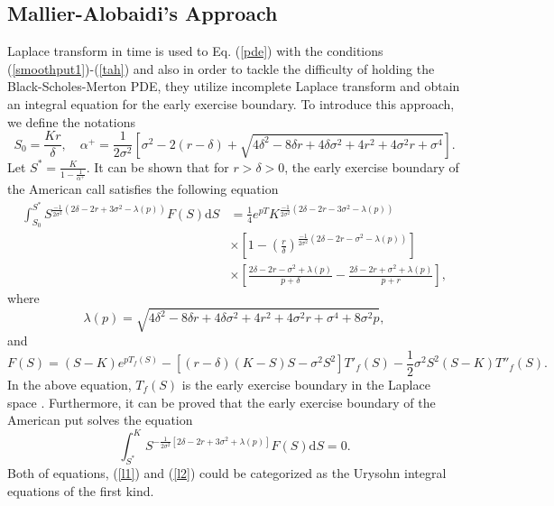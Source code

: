 \documentclass[fleqn,final,3p,11pt]{elsarticle}
\theoremstyle{definition}
\theoremstyle{remark}
\numberwithin{equation}{section}
\begin{document}
\begin{appendices}
\subsection{Mallier-Alobaidi's Approach}
Laplace transform in time is used to Eq. (\ref{pde}) with the conditions (\ref{smoothput1})-(\ref{tah}) and also in order to tackle the difficulty of holding the Black-Scholes-Merton PDE, they utilize incomplete Laplace transform and obtain an integral equation for the early exercise boundary.
To introduce this approach, we define the notations
\[
S_{0} = \frac{Kr}{\delta}, \quad \alpha^{+}= \frac{1}{2\sigma^{2}}\left[  \sigma^{2} -2(r-\delta) + \sqrt{4 \delta^{2} - 8 \delta r + 4 \delta \sigma^{2} + 4 r^{2} + 4\sigma^{2}r + \sigma^{4} } \right].
 \]
Let $S^{*} =  \frac{K}{1-\frac{1}{\alpha^{+}}}$. It can be shown that for $r>\delta>0$, the early exercise boundary of the American call satisfies  the following equation
 \begin{equation}\label{l1}
  \begin{split}
 \int_{S_{0}}^{S^{*}} S^{\frac{-1}{2 \sigma^{2}}\left( 2 \delta -2r + 3\sigma^{2}-\lambda(p)\right) } F(S)\mathrm{d}S&  = \frac{1}{4}e^{pT}K^{\frac{-1}{2\sigma^{2}}\left( 2 \delta -2r -3 \sigma^{2}-\lambda(p) \right) }\\
 & \times \left[ 1 - (\frac{r}{\delta})^{\frac{-1}{2\sigma^{2}}\left( 2 \delta -2r - \sigma^{2}-\lambda(p) \right) } \right] \\
 & \times \left[ \frac{2\delta -2r - \sigma^{2}+ \lambda(p)}{p+ \delta} -  \frac{2\delta -2r + \sigma^{2}+ \lambda(p)}{p+ r} \right],
\end{split}
\end{equation}
where
\[  \lambda (p) = \sqrt{ 4 \delta^{2} - 8 \delta r + 4 \delta \sigma^{2} + 4 r^{2} + 4\sigma^{2}r + \sigma^{4} + 8\sigma^{2} p},\]
and
\[ F(S) = (S - K)e^{p T_{f}(S)} - \left[ (r-\delta)(K-S)S - \sigma^{2}S^{2} \right] T'_{f}(S) -\frac{1}{2}\sigma^{2}S^{2}(S-K)T''_{f}(S).  \]
In the above equation, $T_{f}(S)$ is the early exercise boundary in the Laplace space \cite{gada1}. Furthermore, it can be proved that the early exercise boundary of the American put solves the equation
\begin{equation}\label{l2}
 \int_{S^{*}}^{K} S^{-\frac{1}{2\sigma^{2}}\left[ 2\delta -2r +3 \sigma^{2} +  \lambda(p)\right]}  F(S) \mathrm{d}S = 0. \end{equation}
Both of equations, (\ref{l1}) and (\ref{l2}) could be categorized as the Urysohn integral equations of the first kind.

\end{appendices}
\end{document}
